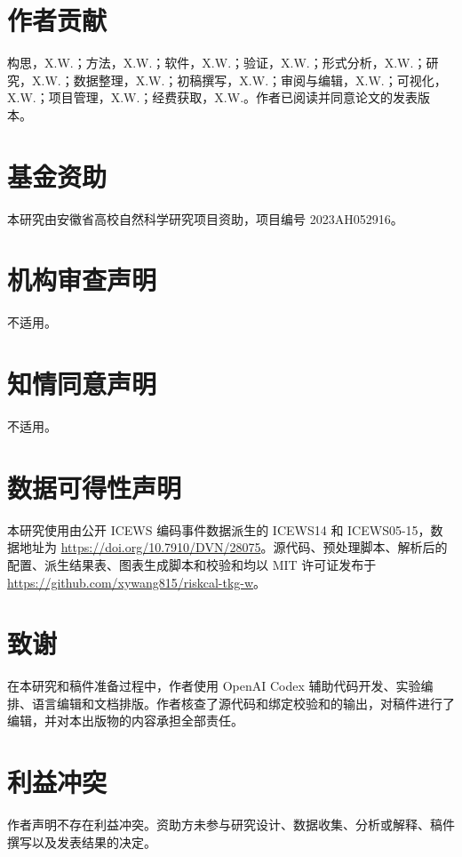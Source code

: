 \documentclass[UTF8,a4paper,11pt]{ctexart}
\begin{document}
\section*{作者贡献}
构思，X.W.；方法，X.W.；软件，X.W.；验证，X.W.；形式分析，X.W.；研究，X.W.；数据整理，X.W.；初稿撰写，X.W.；审阅与编辑，X.W.；可视化，X.W.；项目管理，X.W.；经费获取，X.W.。作者已阅读并同意论文的发表版本。

\section*{基金资助}
本研究由安徽省高校自然科学研究项目资助，项目编号 2023AH052916。

\section*{机构审查声明}
不适用。

\section*{知情同意声明}
不适用。

\section*{数据可得性声明}
本研究使用由公开 ICEWS 编码事件数据派生的 ICEWS14 和 ICEWS05-15，数据地址为 \url{https://doi.org/10.7910/DVN/28075}。源代码、预处理脚本、解析后的配置、派生结果表、图表生成脚本和校验和均以 MIT 许可证发布于 \url{https://github.com/xywang815/riskcal-tkg-w}。

\section*{致谢}
在本研究和稿件准备过程中，作者使用 OpenAI Codex 辅助代码开发、实验编排、语言编辑和文档排版。作者核查了源代码和绑定校验和的输出，对稿件进行了编辑，并对本出版物的内容承担全部责任。

\section*{利益冲突}
作者声明不存在利益冲突。资助方未参与研究设计、数据收集、分析或解释、稿件撰写以及发表结果的决定。

\FloatBarrier
\renewcommand{\refname}{参考文献}
\sloppy


\end{document}
